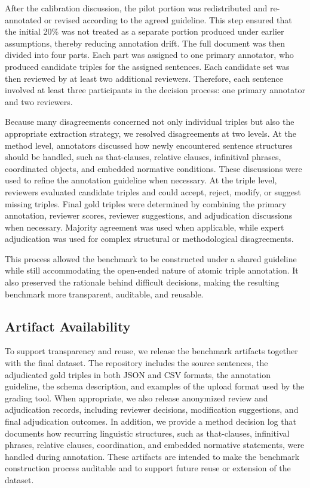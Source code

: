 \documentclass[conference]{IEEEtran}
\begin{document}
After the calibration discussion, the pilot portion was redistributed and re-annotated or revised according to the agreed guideline. This step ensured that the initial 20\% was not treated as a separate portion produced under earlier assumptions, thereby reducing annotation drift. The full document was then divided into four parts. Each part was assigned to one primary annotator, who produced candidate triples for the assigned sentences. Each candidate set was then reviewed by at least two additional reviewers. Therefore, each sentence involved at least three participants in the decision process: one primary annotator and two reviewers.

Because many disagreements concerned not only individual triples but also the appropriate extraction strategy, we resolved disagreements at two levels. At the method level, annotators discussed how newly encountered sentence structures should be handled, such as that-clauses, relative clauses, infinitival phrases, coordinated objects, and embedded normative conditions. These discussions were used to refine the annotation guideline when necessary. At the triple level, reviewers evaluated candidate triples and could accept, reject, modify, or suggest missing triples. Final gold triples were determined by combining the primary annotation, reviewer scores, reviewer suggestions, and adjudication discussions when necessary. Majority agreement was used when applicable, while expert adjudication was used for complex structural or methodological disagreements.

This process allowed the benchmark to be constructed under a shared guideline while still accommodating the open-ended nature of atomic triple annotation. It also preserved the rationale behind difficult decisions, making the resulting benchmark more transparent, auditable, and reusable.

\subsection{Artifact Availability}

To support transparency and reuse, we release the benchmark artifacts together with the final dataset. The repository includes the source sentences, the adjudicated gold triples in both JSON and CSV formats, the annotation guideline, the schema description, and examples of the upload format used by the grading tool. When appropriate, we also release anonymized review and adjudication records, including reviewer decisions, modification suggestions, and final adjudication outcomes. In addition, we provide a method decision log that documents how recurring linguistic structures, such as that-clauses, infinitival phrases, relative clauses, coordination, and embedded normative statements, were handled during annotation. These artifacts are intended to make the benchmark construction process auditable and to support future reuse or extension of the dataset.
\end{document}

